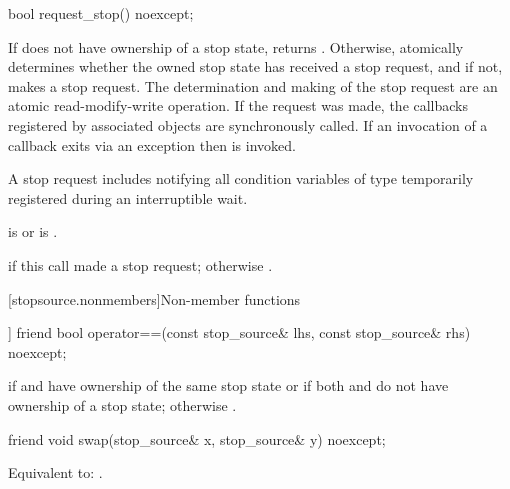 %
\begin{itemdecl}
bool request_stop() noexcept;
\end{itemdecl}

\begin{itemdescr}
\pnum
\effects
If  does not have ownership of a stop state, returns .
Otherwise, atomically determines whether the owned stop state
has received a stop request,
and if not, makes a stop request.
The determination and making of the stop request are an
atomic read-modify-write operation.
If the request was made,
the callbacks registered by associated  objects
are synchronously called.
If an invocation of a callback exits via an exception
then  is invoked.
\begin{note}
A stop request includes notifying all condition variables
of type 
temporarily registered during
an interruptible wait.
\end{note}

\pnum
\ensures
{} is 
or  is .

\pnum
\returns
{} if this call made a stop request;
otherwise .
\end{itemdescr}

[stopsource.nonmembers]{Non-member functions}

%
\begin{itemdecl}
[[nodiscard]] friend bool
  operator==(const stop_source& lhs, const stop_source& rhs) noexcept;
\end{itemdecl}

\begin{itemdescr}
\pnum
\returns
{} if  and  have ownership
of the same stop state
or if both  and  do not have ownership of a stop state;
otherwise .
\end{itemdescr}

%
\begin{itemdecl}
friend void swap(stop_source& x, stop_source& y) noexcept;
\end{itemdecl}

\begin{itemdescr}
\pnum
\effects
Equivalent to: .
\end{itemdescr}

